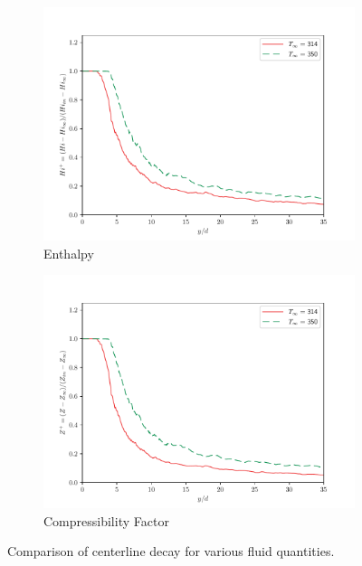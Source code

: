 \begin{figure}[H]
\begin{center}
\begin{subfigure}{0.45\textwidth}
	\includegraphics[scale=.45]{figures/Plots/centerline/Hi_centerline_scaled.pdf}
	\caption{Enthalpy} \label{noniso_Hi_centerline_1}
\end{subfigure}
\begin{subfigure}{0.45\textwidth}
	\includegraphics[scale=.45]{figures/Plots/centerline/Z_centerline_scaled.pdf}
	\caption{Compressibility Factor} \label{noniso_Z_centerline_1}
\end{subfigure}

\caption{Comparison of centerline decay for various fluid quantities.}
\label{noniso_centerline_features}
\end{center}
\end{figure}




